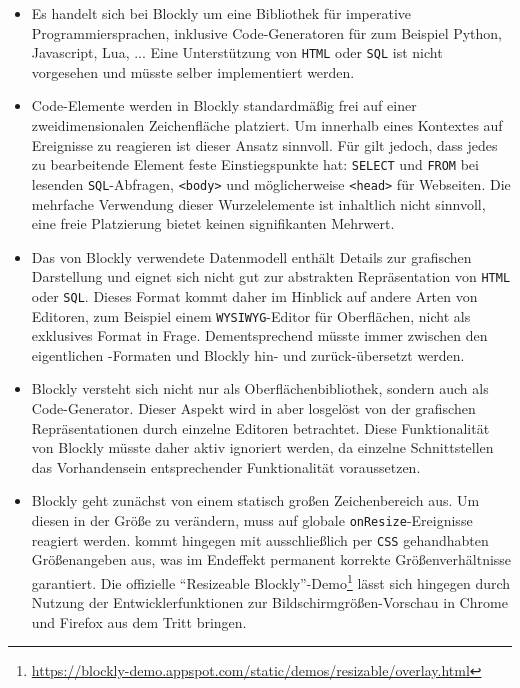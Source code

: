 \begin{itemize}[noitemsep]
\item Es handelt sich bei Blockly um eine Bibliothek für imperative Programmiersprachen, inklusive Code-Generatoren für zum Beispiel Python, Javascript, Lua, ... Eine Unterstützung von \texttt{HTML} oder \texttt{SQL} ist nicht vorgesehen und müsste selber implementiert werden.
  
\item Code-Elemente werden in Blockly standardmäßig frei auf einer zweidimensionalen Zeichenfläche platziert. Um innerhalb eines Kontextes auf Ereignisse zu reagieren ist dieser Ansatz sinnvoll. Für \idename{} gilt jedoch, dass jedes zu bearbeitende Element feste Einstiegspunkte hat: \texttt{SELECT} und \texttt{FROM} bei lesenden \texttt{SQL}-Abfragen, \texttt{<body>} und möglicherweise \texttt{<head>} für Webseiten. Die mehrfache Verwendung dieser Wurzelelemente ist inhaltlich nicht sinnvoll, eine freie Platzierung bietet keinen signifikanten Mehrwert.

\item Das von Blockly verwendete Datenmodell enthält Details zur grafischen Darstellung und eignet sich nicht gut zur abstrakten Repräsentation von \texttt{HTML} oder \texttt{SQL}. Dieses Format kommt daher im Hinblick auf andere Arten von Editoren, zum Beispiel einem \texttt{WYSIWYG}-Editor für Oberflächen, nicht als exklusives Format in Frage. Dementsprechend müsste immer zwischen den eigentlichen \idename{}-Formaten und Blockly hin- und zurück-übersetzt werden.
  
\item Blockly versteht sich nicht nur als Oberflächenbibliothek, sondern auch als Code-Generator. Dieser Aspekt wird in \idename{} aber losgelöst von der grafischen Repräsentationen durch einzelne Editoren betrachtet. Diese Funktionalität von Blockly müsste daher aktiv ignoriert werden, da einzelne Schnittstellen das Vorhandensein entsprechender Funktionalität voraussetzen.
  
\item Blockly geht zunächst von einem statisch großen Zeichenbereich aus. Um diesen in der Größe zu verändern, muss auf globale \texttt{onResize}-Ereignisse reagiert werden. \idename{} kommt hingegen mit ausschließlich per \texttt{CSS} gehandhabten Größenangeben aus, was im Endeffekt permanent korrekte Größenverhältnisse garantiert. Die offizielle "`Resizeable Blockly"'-Demo\footnote{\url{https://blockly-demo.appspot.com/static/demos/resizable/overlay.html}} lässt sich hingegen durch Nutzung der Entwicklerfunktionen zur Bildschirmgrößen-Vorschau in Chrome und Firefox aus dem Tritt bringen.
\end{itemize}

